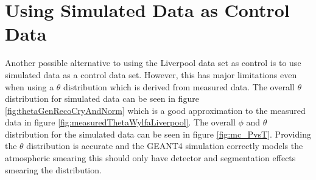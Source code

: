 \section{Using Simulated Data as Control Data}\label{sec:usingSimulatedDataAsControlData}
Another possible alternative to using the Liverpool data set as control is to use simulated data as a control data set. However, this has major limitations even when using a $\theta$ distribution which is derived from measured data. The overall $\theta$ distribution for simulated data can be seen in figure \ref{fig:thetaGenRecoCryAndNorm} which is a good approximation to the measured data in figure \ref{fig:measuredThetaWylfaLiverpool}. The overall $\phi$ and $\theta$ distribution for the simulated data can be seen in figure \ref{fig:mc_PvsT}. Providing the $\theta$ distribution is accurate and the GEANT4 simulation correctly models the atmospheric smearing this should only have detector and segmentation effects smearing the distribution. 


